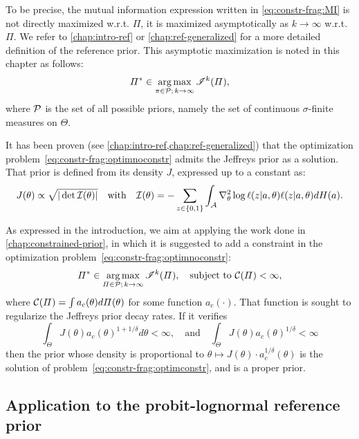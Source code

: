 To be precise, the mutual information expression written in \cref{eq:constr-frag:MI} is not directly maximized w.r.t. $\varPi$, it is maximized asymptotically as $k\rightarrow\infty$ w.r.t. $\varPi$. We refer to   \cref{chap:intro-ref} or   \cref{chap:ref-generalized} for a more detailed definition of the reference prior. This asymptotic maximization is noted in this chapter as follows:
\begin{equation}\label{eq:constr-frag:optimnoconstr}
    \varPi^\ast\in\operatorname*{arg\,max}_{\pi\in\mathcal{P};\,k\rightarrow\infty}\mathscr{I}^k(\varPi),
\end{equation}
where $\mathcal{P}$ is the set of all possible priors, namely the set of continuous $\sigma$-finite measures on $\Theta$.

It has been proven (see \cref{chap:intro-ref,chap:ref-generalized}) that the optimization problem~\eqref{eq:constr-frag:optimnoconstr} admits the Jeffreys prior as a solution. That prior is defined from its density $J$, expressed up to a constant as:
    \begin{equation}
        J(\theta)\propto\sqrt{|\det\mathcal{I}(\theta)|}\quad\text{with}\quad \mathcal{I}(\theta) = -\sum_{z\in\{0,1\}}\int_{\mathcal{A}}\nabla_\theta^2\log\ell(z|a,\theta) \ell(z|a,\theta)dH(a).
    \end{equation}

As expressed in the introduction, we aim at applying the work done in   \cref{chap:constrained-prior}, in which it is suggested to add a constraint in the optimization problem~\eqref{eq:constr-frag:optimnoconstr}:
\begin{equation}\label{eq:constr-frag:optimconstr}
    \varPi^\ast\in\operatorname*{arg\,max}_{\varPi\in\mathcal{P};\,k\rightarrow\infty}\mathscr{I}^k(\varPi),\quad\text{subject to\ }\mathcal{C}(\varPi)<\infty,
\end{equation}
where $\mathcal{C}(\varPi)= \int a_c(\theta)d\varPi(\theta)$ for some function $a_c(\cdot)$.
That function is sought to regularize the Jeffreys prior decay rates. If it verifies
    \begin{equation}\label{eq:constr-frag:inta}
        \int_\Theta J(\theta)a_c(\theta)^{1+1/\delta}d\theta <\infty, \quad\text{and} \quad \int_\Theta J(\theta)a_c(\theta)^{1/\delta}<\infty 
    \end{equation}
then the prior whose density is proportional to $\theta\mapsto J(\theta)\cdot a_c^{1/\delta}(\theta)$ is the solution of problem~\eqref{eq:constr-frag:optimconstr}, and is a proper prior.


\subsection{Application to the probit-lognormal reference prior}\label{sec:constr-frags:subsec-constr-in-probit}


